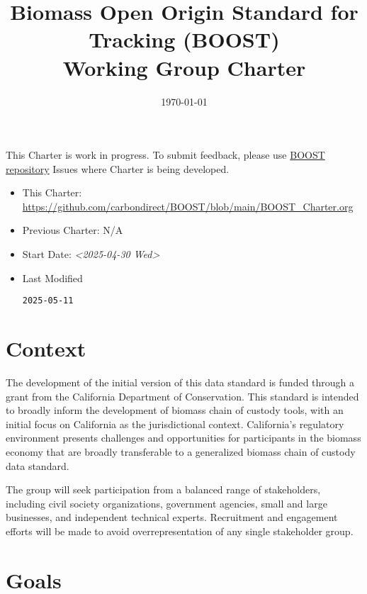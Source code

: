 \documentclass[title=small,preset=opensansnote,par=skip]{article}
\date{\today}
\title{Biomass Open Origin Standard for Tracking (BOOST)\\\medskip
\large Working Group Charter}
\begin{document}
\maketitle

This Charter is work in progress. To submit feedback, please use \href{https://github.com/carbondirect/BOOST}{BOOST repository} Issues where Charter is being developed. 

\begin{itemize}
\item This Charter: \href{https://github.com/carbondirect/BOOST/blob/main/BOOST\_Charter.org}{https://github.com/carbondirect/BOOST/blob/main/BOOST\_Charter.org}
\item Previous Charter: N/A
\item Start Date: \textit{<2025-04-30 Wed>}
\item Last Modified
\label{}
\begin{verbatim}
2025-05-11
\end{verbatim}
\end{itemize}
\section{Context}
\label{sec:org2eae1f2}

The development of the initial version of this data standard is funded through a grant from the California Department of Conservation. This standard is intended to broadly inform the development of biomass chain of custody tools, with an initial focus on California as the jurisdictional context. California's regulatory environment presents challenges and opportunities for participants in the biomass economy that are broadly transferable to a generalized biomass chain of custody data standard.

The group will seek participation from a balanced range of stakeholders, including civil society organizations, government agencies, small and large businesses, and independent technical experts. Recruitment and engagement efforts will be made to avoid overrepresentation of any single stakeholder group.
\section{Goals}
\label{sec:org1455147}
\end{document}
